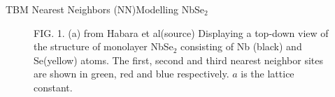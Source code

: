 \documentclass[9pt]{beamer}
\begin{document}
\begin{frame}{TBM Nearest Neighbors (NN)}{Modelling NbSe$_2$}
  \begin{figure}
    \centering
    \caption{FIG. 1. (a) from Habara et al(source) Displaying a top-down view of the structure of monolayer NbSe$_2$ consisting of Nb (black) and Se(yellow) atoms. The first, second and third nearest neighbor sites are shown in green, red and blue respectively. $a$ is the lattice constant.}
  \end{figure}
\end{frame}
\end{document}
